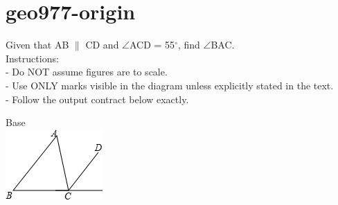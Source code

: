 \documentclass[12pt]{article}
\begin{document}
\section*{geo977-origin}
\noindent\begin{minipage}{\textwidth}
\setlength{\parskip}{4pt}
Given that AB \ensuremath{\parallel } CD and \ensuremath{\angle }ACD = 55\ensuremath{^\circ}, find \ensuremath{\angle }BAC.\\
Instructions:\\
- Do NOT assume figures are to scale.\\
- Use ONLY marks visible in the diagram unless explicitly stated in the text.\\
- Follow the output contract below exactly.\\
\end{minipage}
\begin{center}
\begin{minipage}{0.32\textwidth}\centering
Base\\
\includegraphics[width=0.95\linewidth]{out_rommath_origin/items/geo977-origin/assets/figure.png}
\end{minipage}
\par
\end{center}
\bigskip
\end{document}
